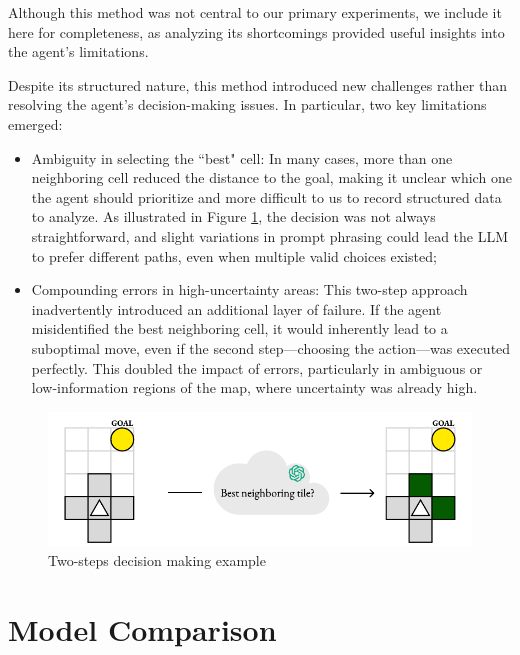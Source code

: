 Although this method was not central to our primary experiments, we include it here
for completeness, as analyzing its shortcomings provided useful insights into
the agent's limitations.

Despite its structured nature, this method introduced new challenges rather than
resolving the agent's decision-making issues. In particular, two key limitations
emerged:
\begin{itemize}
  \item Ambiguity in selecting the ``best" cell: In many cases, more than one
    neighboring cell reduced the distance to the goal, making it unclear which one
    the agent should prioritize and more difficult to us to record structured data
    to analyze. As illustrated in Figure \ref{fig:extra2}, the decision was not always
    straightforward, and slight variations in prompt phrasing could lead the LLM
    to prefer different paths, even when multiple valid choices existed;

  \item Compounding errors in high-uncertainty areas: This two-step approach
    inadvertently introduced an additional layer of failure. If the agent misidentified
    the best neighboring cell, it would inherently lead to a suboptimal move, even
    if the second step—choosing the action—was executed perfectly. This doubled
    the impact of errors, particularly in ambiguous or low-information regions of
    the map, where uncertainty was already high.
\end{itemize}

\vspace{7mm}
\begin{figure}[h!]
  \centering
  \includegraphics[width=.66\textwidth]{images/results_discussion/extra2.pdf}
  \caption{Two-steps decision making example}
  \label{fig:extra2}
\end{figure}
\vspace{7mm}

\section{Model Comparison}
\label{sec:model_comparison}

